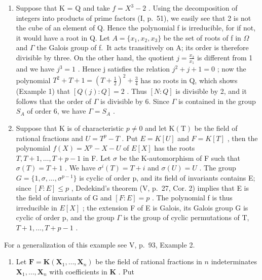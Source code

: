 \begin{enumerate}
\def\labelenumi{\arabic{enumi})}
\setcounter{enumi}{2}
\item
  Suppose that K = Q and take \(f = X^{3} - 2\) . Using the decomposition of integers into products of prime factors (I, p.~51), we easily see that 2 is not the cube of an element of Q. Hence the polynomial f is irreducible, for if not, it would have a root in Q. Let \(A = \{x_{1}, x_{2}, x_{3}\}\) be the set of roots of f in \(\Omega\) and \(\Gamma\) the Galois group of f.~It acts transitively on A; its order is therefore divisible by three. On the other hand, the quotient \(j = \frac{x_{2}}{x_{1}}\) is different from 1 and we have \(j^{3} = 1\) . Hence j satisfies the relation \(j^{2} + j + 1 = 0\) ; now the polynomial \(T^{2} + T + 1 = \left(T + \frac{1}{2}\right)^{2} + \frac{3}{4}\) has no roots in Q, which shows (Example 1) that \([Q(j): Q] = 2\) . Thus \([N: Q]\) is divisible by 2, and it follows that the order of \(\Gamma\) is divisible by 6. Since \(\Gamma\) is contained in the group \(S_{A}\) of order 6, we have \(\Gamma = S_{A}\) .
\item
  Suppose that K is of characteristic \(p \neq 0\) and let \(\mathrm{K}(\mathrm{T})\) be the field of rational fractions and \(U = T^{p} - T\) . Put \(E = K[U]\) and \(F = K[T]\) , then the polynomial \(f(X) = X^{p} - X - U\) of \(E[X]\) has the roots \(T, T + 1, \ldots, T + p - 1\) in F. Let \(\sigma\) be the K-automorphism of F such that \(\sigma(T) = T + 1\) . We have \(\sigma^{i}(T) = T + i\) and \(\sigma(U) = U\) . The group \(G = \{1, \sigma, \ldots, \sigma^{p-1}\}\) is cyclic of order p, and its field of invariants contains E; since \([F: E] \leqslant p\) , Dedekind's theorem (V, p.~27, Cor. 2) implies that E is the field of invariants of G and \([F: E] = p\) . The polynomial f is thus irreducible in \(E[X]\) ; the extension F of E is Galois, its Galois group G is cyclic of order p, and the group \(\Gamma\) is the group of cyclic permutations of T, \(T + 1, \ldots, T + p - 1\) .
\end{enumerate}

For a generalization of this example see V, p.~93, Example 2.

\begin{enumerate}
\def\labelenumi{\arabic{enumi})}
\setcounter{enumi}{4}
\tightlist
\item
  Let \(\mathbf{F} = \mathbf{K}(\mathbf{X}_1, \ldots, \mathbf{X}_n)\) be the field of rational fractions in \(n\) indeterminates \(\mathbf{X}_1, \ldots, \mathbf{X}_n\) with coefficients in \(\mathbf{K}\) . Put
\end{enumerate}

